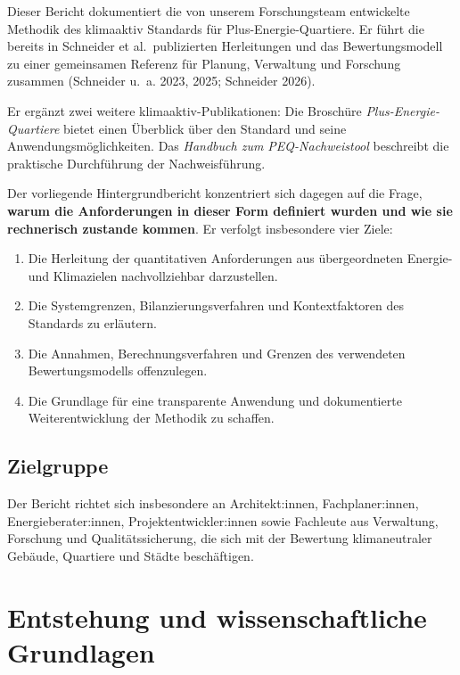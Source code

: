 \documentclass[
  ngerman,
  a4paper,
  DIV=11]{scrreprt}
\providecommand{\tightlist}{%
  \setlength{\itemsep}{0pt}\setlength{\parskip}{0pt}}
\begin{document}

Dieser Bericht dokumentiert die von unserem Forschungsteam entwickelte
Methodik des klimaaktiv Standards für Plus-Energie-Quartiere. Er führt
die bereits in Schneider et al.~publizierten Herleitungen und das
Bewertungsmodell zu einer gemeinsamen Referenz für Planung, Verwaltung
und Forschung zusammen (Schneider u.~a. 2023, 2025; Schneider 2026).

Er ergänzt zwei weitere klimaaktiv-Publikationen: Die Broschüre
\emph{Plus-Energie-Quartiere} bietet einen Überblick über den Standard
und seine Anwendungsmöglichkeiten. Das \emph{Handbuch zum
PEQ-Nachweistool} beschreibt die praktische Durchführung der
Nachweisführung.

Der vorliegende Hintergrundbericht konzentriert sich dagegen auf die
Frage, \textbf{warum die Anforderungen in dieser Form definiert wurden
und wie sie rechnerisch zustande kommen}. Er verfolgt insbesondere vier
Ziele:

\begin{enumerate}
\def\labelenumi{\arabic{enumi}.}
\tightlist
\item
  Die Herleitung der quantitativen Anforderungen aus übergeordneten
  Energie- und Klimazielen nachvollziehbar darzustellen.
\item
  Die Systemgrenzen, Bilanzierungsverfahren und Kontextfaktoren des
  Standards zu erläutern.
\item
  Die Annahmen, Berechnungsverfahren und Grenzen des verwendeten
  Bewertungsmodells offenzulegen.
\item
  Die Grundlage für eine transparente Anwendung und dokumentierte
  Weiterentwicklung der Methodik zu schaffen.
\end{enumerate}

\subsection*{Zielgruppe}\label{zielgruppe}

Der Bericht richtet sich insbesondere an Architekt:innen,
Fachplaner:innen, Energieberater:innen, Projektentwickler:innen sowie
Fachleute aus Verwaltung, Forschung und Qualitätssicherung, die sich mit
der Bewertung klimaneutraler Gebäude, Quartiere und Städte beschäftigen.

\section*{Entstehung und wissenschaftliche
Grundlagen}\label{entstehung-und-wissenschaftliche-grundlagen}
\end{document}
